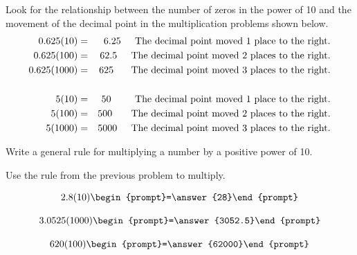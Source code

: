 \documentclass{ximera}
\begin{document}
Look for the relationship between the number of zeros in the power of 10 and the movement of the decimal point in the multiplication problems shown below.
\begin{eqnarray*}
0.625 (10) &=& 6.25 \hspace{0.2in} \textrm{The decimal point moved 1 place to the right.} \\
0.625 (100) &=&  62.5  \hspace{0.2in} \textrm{The decimal point moved 2 places to the right.} \\
0.625 (1000) &=& 625 \hspace{0.25in} \textrm{The decimal point moved 3 places to the right.}\\
& & \\
5 (10) &=& 50 \hspace{0.34in} \textrm{The decimal point moved 1 place to the right.} \\
5 (100) &=&  500  \hspace{0.27in} \textrm{The decimal point moved 2 places to the right.} \\
5 (1000) &=& 5000 \hspace{0.2in} \textrm{The decimal point moved 3 places to the right.}
\end{eqnarray*}

\begin{problem} Write a general rule for multiplying a number by a positive power of 10.

\begin{multipleChoice}
  \end{multipleChoice}

\end{problem}

\begin{center}
\end{center}

\begin{problem}  Use the rule from the previous problem to multiply.

\[ 2.8 (10) \begin{prompt}=\answer{28}\end{prompt} \]


\[ 3.0525 (1000) \begin{prompt}=\answer{3052.5}\end{prompt} \]

\[ 620 (100) \begin{prompt}=\answer{62000}\end{prompt} \]

\end{problem}
\end{document}
